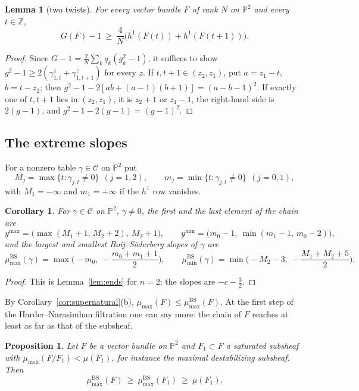 \documentclass[11pt]{amsart}
\newtheorem{proposition}[theorem]{Proposition}
\newtheorem{lemma}[theorem]{Lemma}
\newtheorem{corollary}[theorem]{Corollary}
\theoremstyle{definition}
\theoremstyle{remark}
\newcommand{\PP}{\mathbb{P}}
\newcommand{\ZZ}{\mathbb{Z}}
\newcommand{\CC}{\mathcal{C}}
\newcommand{\BS}{\mathrm{BS}}
\begin{document}
\begin{lemma}[two twists]\label{lem:twotwist}
For every vector bundle $F$ of rank $N$ on $\PP^2$ and every $t\in\ZZ$,
\[
G(F)-1\ \ge\ \frac4N\Big(h^1(F(t))+h^1(F(t+1))\Big).
\]
\end{lemma}

\begin{proof}
Since $G-1=\frac2N\sum_kq_k(g_k^2-1)$, it suffices to show $g^2-1\ge2(\gamma^z_{1,t}+\gamma^z_{1,t+1})$ for every $z$. If $t,t+1\in(z_2,z_1)$, put $a=z_1-t$, $b=t-z_2$; then $g^2-1-2[ab+(a-1)(b+1)]=(a-b-1)^2$. If exactly one of $t,t+1$ lies in $(z_2,z_1)$, it is $z_2+1$ or $z_1-1$, the right-hand side is $2(g-1)$, and $g^2-1-2(g-1)=(g-1)^2$.
\end{proof}

\subsection{The extreme slopes}
For a nonzero table $\gamma\in\CC$ on $\PP^2$ put
\[
M_j=\max\{t:\gamma_{j,t}\ne0\}\ \ (j=1,2),\qquad m_j=\min\{t:\gamma_{j,t}\ne0\}\ \ (j=0,1),
\]
with $M_1=-\infty$ and $m_1=+\infty$ if the $h^1$ row vanishes.

\begin{corollary}\label{cor:endsP2}
For $\gamma\in\CC$ on $\PP^2$, $\gamma\ne0$, the first and the last element of the chain are
\[
y^{\max}=\big(\max(M_1+1,\,M_2+2),\ M_2+1\big),\qquad y^{\min}=\big(m_0-1,\ \min(m_1-1,\,m_0-2)\big),
\]
and the largest and smallest Boij--Söderberg slopes of $\gamma$ are
\[
\mu^\BS_{\max}(\gamma)=\max\Big(-m_0,\ -\frac{m_0+m_1+1}2\Big),\qquad
\mu^\BS_{\min}(\gamma)=\min\Big(-M_2-3,\ -\frac{M_1+M_2+5}2\Big).
\]
\end{corollary}

\begin{proof}
This is Lemma~\ref{lem:ends} for $n=2$; the slopes are $-c-\frac32$.
\end{proof}

By Corollary~\ref{cor:supernatural}(b), $\mu_{\max}(F)\le\mu^\BS_{\max}(F)$. At the first step of the Harder--Narasimhan filtration one can say more: the chain of $F$ reaches at least as far as that of the subsheaf.

\begin{proposition}\label{prop:firstedge}
Let $F$ be a vector bundle on $\PP^2$ and $F_1\subset F$ a saturated subsheaf with $\mu_{\max}(F/F_1)<\mu(F_1)$, for instance the maximal destabilizing subsheaf. Then
\[
\mu^\BS_{\max}(F)\ \ge\ \mu^\BS_{\max}(F_1)\ \ge\ \mu(F_1).
\]
\end{proposition}
\end{document}
